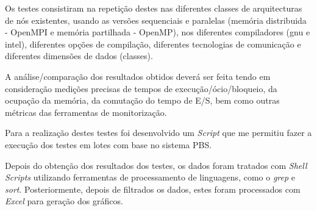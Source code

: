 \documentclass[conference,compsoc]{IEEEtran}
\begin{document}
Os testes consistiram na repetição destes nas diferentes classes de arquitecturas de nós existentes, usando as versões sequenciais e paralelas (memória distribuida - OpenMPI e memória partilhada - OpenMP), nos diferentes compiladores (gnu e intel), diferentes opções de compilação, diferentes tecnologias de comunicação e diferentes dimensões de dados (classes).


A análise/comparação dos resultados obtidos deverá ser feita tendo em consideração medições precisas de tempos de execução/ócio/bloqueio, da ocupação da memória, da comutação do tempo de E/S, bem como outras métricas das ferramentas de monitorização.


Para a realização destes testes foi desenvolvido um \textit{Script} que me permitiu fazer a execução dos testes em lotes com base no sistema PBS.

Depois do obtenção dos resultados dos testes, os dados foram tratados com \textit{Shell Scripts} utilizando ferramentas de processamento de linguagens, como o \textit{grep} e \textit{sort}. Posteriormente, depois de filtrados os dados, estes foram processados com \textit{Excel} para geração dos gráficos.
\end{document}

